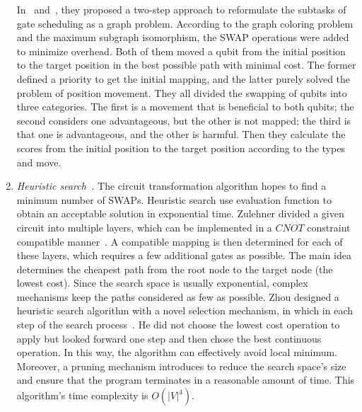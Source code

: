 \documentclass[runningheads]{llncs}
\begin{document}
\begin{enumerate}
	In~\cite{Guerreschi2018} and~\cite{Matsuo2019}, they proposed a two-step approach to reformulate the subtasks of gate scheduling as a graph problem. According to the graph coloring problem and the maximum subgraph isomorphism, the SWAP operations were added to minimize overhead. Both of them moved a qubit from the initial position to the target position in the best possible path with minimal cost. The former defined a priority to get the initial mapping, and the latter purely solved the problem of position movement. They all divided the swapping of qubits into three categories. The first is a movement that is beneficial to both qubits; the second considers one advantageous, but the other is not mapped; the third is that one is advantageous, and the other is harmful. Then they calculate the scores from the initial position to the target position according to the types and move.
	\item \emph{Heuristic search~\cite{Zulehner2017,Cowtan2019,Li2018,Xiangzhen2020,2018QubitSiraichi}.}
	The circuit transformation algorithm hopes to find a minimum number of SWAPs. Heuristic search use evaluation function to obtain an acceptable solution in exponential time. Zulehner divided a given circuit into multiple layers, which can be implemented in a $CNOT$ constraint compatible manner~\cite{Zulehner2017}. A compatible mapping is then determined for each of these layers, which requires a few additional gates as possible. The main idea determines the cheapest path from the root node to the target node (the lowest cost). Since the search space is usually exponential, complex mechanisms keep the paths considered as few as possible. Zhou designed a heuristic search algorithm with a novel selection mechanism, in which in each step of the search process~\cite{Xiangzhen2020}. He did not choose the lowest cost operation to apply but looked forward one step and then chose the best continuous operation.    In this way, the algorithm can effectively avoid local minimum. Moreover, a pruning mechanism introduces to reduce the search space's size and ensure that the program terminates in a reasonable amount of time. This algorithm's time complexity is $O(|V|^{4})$.


\end{enumerate}
\end{document}
